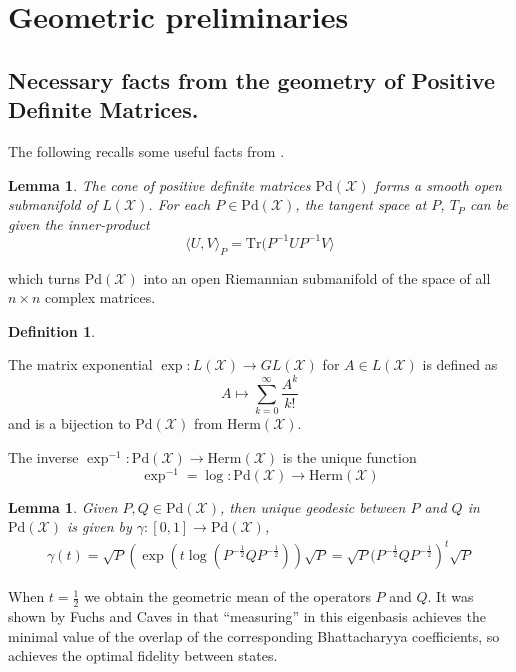\documentclass{amsart}
\numberwithin{equation}{section}
\newtheorem{lemma}[theorem]{Lemma}
\theoremstyle{definition}
\newtheorem{definition}[theorem]{Definition}
\theoremstyle{plain}
\theoremstyle{solutionstyle}
\begin{document}
\section{Geometric preliminaries}\label{Section 4}
\subsection{Necessary facts from the geometry of Positive Definite Matrices.}
The following recalls some useful facts from \cite{franco2026conejhermitianmatricesgeometric}.
\begin{lemma}\cite{franco2026conejhermitianmatricesgeometric}
    The cone of positive definite matrices $\mathrm{Pd}(\mathcal{X})$ forms a smooth open submanifold of $L(\mathcal{X})$. For each $P\in \mathrm{Pd}(\mathcal{X})$, the tangent space at $P$, $T_P$ can be given the inner-product 
    \begin{equation*}\langle U, V\rangle_P=\mathrm{Tr}(P^{-1}UP^{-1}V\rangle\end{equation*}
\end{lemma}
which turns $\mathrm{Pd}(\mathcal{X})$ into an open Riemannian submanifold of the space of all $n\times n$ complex matrices. 
\begin{definition}\cite{franco2026conejhermitianmatricesgeometric}
    \item The matrix exponential $\exp:L(\mathcal{X})\to GL(\mathcal{X})$ for $A\in L(\mathcal{X})$ is defined as
    \begin{equation*}A\mapsto \sum_{k=0}^\infty \frac{A^k}{k!}\end{equation*} and is a bijection to $\mathrm{Pd}(\mathcal{X})$ from $\mathrm{Herm}(\mathcal{X})$. 
    \item The inverse $\exp^{-1}:\mathrm{Pd}(\mathcal{X})\to \mathrm{Herm}(\mathcal{X})$ is the unique function \begin{equation*}\exp^{-1}=\log:\mathrm{Pd}(\mathcal{X})\to \mathrm{Herm}(\mathcal{X})\end{equation*} 
\end{definition}
\begin{lemma}\cite{franco2026conejhermitianmatricesgeometric}
    Given $P,Q\in \mathrm{Pd}(\mathcal{X})$, then unique geodesic between $P$ and $Q$ in $\mathrm{Pd}(\mathcal{X})$ is given by $\gamma:[0,1]\to \mathrm{Pd}(\mathcal{X})$,
    \begin{align*}
        \gamma(t)=\sqrt{P}\left(\exp(t\log(P^{-\frac{1}{2}}QP^{-\frac{1}{2}}))\sqrt{P}=\sqrt{P}(P^{-\frac{1}{2}}QP^{-\frac{1}{2}}\right)^t\sqrt{P}
    \end{align*}
\end{lemma}
When $t=\frac{1}{2}$ we obtain the geometric mean of the operators $P$ and $Q$. It was shown by Fuchs and Caves in \cite{fuchs1996mathematicaltechniquesquantumcommunication} that ``measuring'' in this eigenbasis achieves the minimal value of the overlap of the corresponding Bhattacharyya coefficients, so achieves the optimal fidelity between states.
\end{document}
